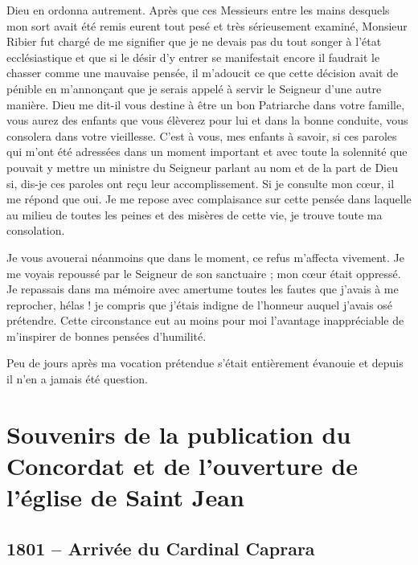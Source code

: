 \documentclass[11pt,a4paper]{report}
\begin{document}
Dieu en ordonna autrement. Après que ces Messieurs entre les mains desquels mon sort avait été remis eurent tout pesé et très sérieusement examiné, Monsieur Ribier fut chargé de me signifier que je ne devais pas du tout songer à l'état ecclésiastique et que si le désir d'y entrer se manifestait encore il faudrait le chasser comme une mauvaise pensée, il m'adoucit ce que cette décision avait de pénible en m'annonçant que je serais appelé à servir le Seigneur d'une autre manière. Dieu me dit-il vous destine à être un bon Patriarche dans votre famille, vous aurez des enfants que vous élèverez pour lui et dans la bonne conduite, vous consolera dans votre vieillesse. C'est à vous, mes enfants à savoir, si ces paroles qui m'ont été adressées dans un moment important et avec toute la solennité que pouvait y mettre un ministre du Seigneur parlant au nom et de la part de Dieu si, dis-je ces paroles ont reçu leur accomplissement. Si je consulte mon cœur, il me répond que oui. Je me repose avec complaisance sur cette pensée dans laquelle au milieu de toutes les peines et des misères de cette vie, je trouve toute ma consolation.

Je vous avouerai néanmoins que dans le moment, ce refus m'affecta vivement. Je me voyais repoussé par le Seigneur de son sanctuaire ; mon cœur était oppressé. Je repassais dans ma mémoire avec amertume toutes les fautes que j'avais à me reprocher, hélas ! je compris que j'étais indigne de l'honneur auquel j'avais osé prétendre. Cette circonstance eut au moins pour moi l'avantage inappréciable de m'inspirer de bonnes pensées d'humilité.

Peu de jours après ma vocation prétendue s'était entièrement évanouie et depuis il n'en a jamais été question.

\chapter{Souvenirs de la publication du Concordat et de l'ouverture de l'église de Saint Jean}

\section*{1801 -- Arrivée du Cardinal Caprara}
\end{document}
